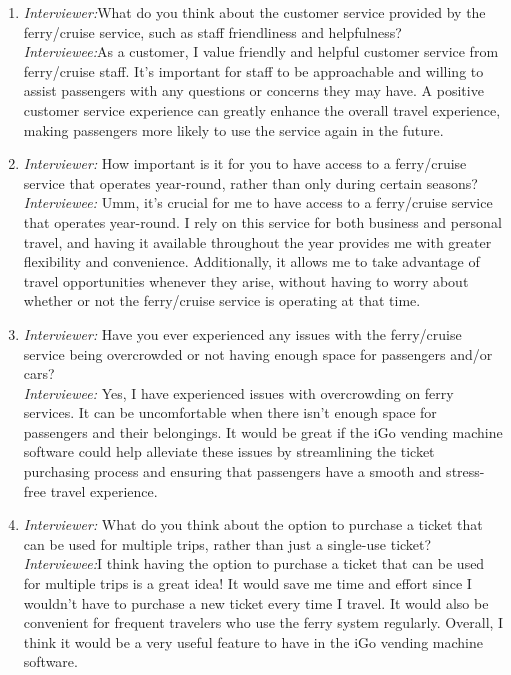 \begin{enumerate}
\item \emph{Interviewer:}What do you think about the customer service provided by the ferry/cruise service, such as staff friendliness and helpfulness?\\
\emph{Interviewee:}As a customer, I value friendly and helpful customer service from ferry/cruise staff. It's important for staff to be approachable and willing to assist passengers with any questions or concerns they may have. A positive customer service experience can greatly enhance the overall travel experience, making passengers more likely to use the service again in the future.
\item \emph{Interviewer:} How important is it for you to have access to a ferry/cruise service that operates year-round, rather than only during certain seasons?\\
\emph{Interviewee:} Umm, it's crucial for me to have access to a ferry/cruise service that operates year-round. I rely on this service for both business and personal travel, and having it available throughout the year provides me with greater flexibility and convenience. Additionally, it allows me to take advantage of travel opportunities whenever they arise, without having to worry about whether or not the ferry/cruise service is operating at that time.
\item \emph{Interviewer:} Have you ever experienced any issues with the ferry/cruise service being overcrowded or not having enough space for passengers and/or cars?\\
\emph{Interviewee:} Yes, I have experienced issues with overcrowding on ferry services. It can be uncomfortable when there isn't enough space for passengers and their belongings. It would be great if the iGo vending machine software could help alleviate these issues by streamlining the ticket purchasing process and ensuring that passengers have a smooth and stress-free travel experience.
\item \emph{Interviewer:} What do you think about the option to purchase a ticket that can be used for multiple trips, rather than just a single-use ticket?\\
\emph{Interviewee:}I think having the option to purchase a ticket that can be used for multiple trips is a great idea! It would save me time and effort since I wouldn't have to purchase a new ticket every time I travel. It would also be convenient for frequent travelers who use the ferry system regularly. Overall, I think it would be a very useful feature to have in the iGo vending machine software.

\end{enumerate}
